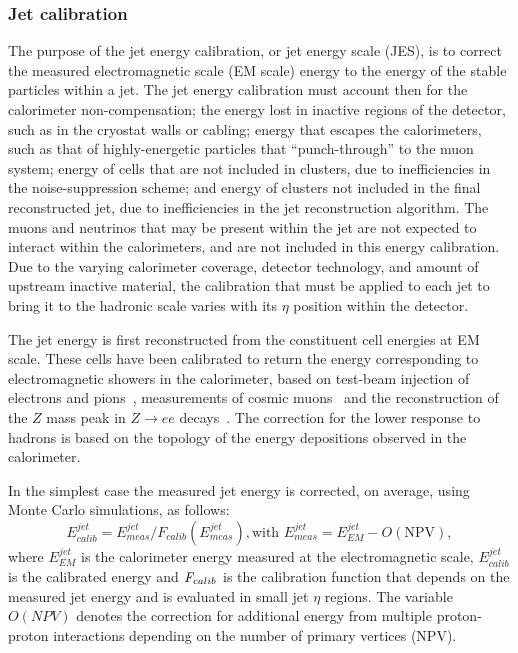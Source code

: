 \subsubsection{Jet calibration}

The purpose of the jet energy calibration, or jet energy scale (JES), is to correct the measured electromagnetic scale (EM scale) energy to the energy of the stable particles within a jet.  The jet energy calibration must account then for the calorimeter non-compensation; the energy lost in inactive regions of the detector, such as in the cryostat walls or cabling; energy that escapes the calorimeters, such as that of highly-energetic particles that ``punch-through'' to the muon system; energy of cells that are not included in clusters, due to inefficiencies in the noise-suppression scheme; and energy of clusters not included in the final reconstructed jet, due to inefficiencies in the jet reconstruction algorithm. The muons and neutrinos that may be present within the jet are not expected to interact within the calorimeters, and are not included in this energy calibration.
Due to the varying calorimeter coverage, detector technology, and amount of upstream inactive material, the calibration that must be applied to each jet to bring it to the hadronic scale varies with its $\eta$ position within the detector. 

The jet energy is first reconstructed from the constituent cell energies at EM scale. These cells have been calibrated to return the energy corresponding to electromagnetic showers in the calorimeter, based on test-beam injection of electrons and pions~\cite{Aharrouche2006601},  measurements of cosmic muons~\cite{Cooke:1071187} and the reconstruction of the $Z$ mass peak in $Z \rightarrow ee$ decays~\cite{Aad:2011mk}. The correction for the lower response to hadrons is based on the topology of the energy depositions observed in the calorimeter. 

In the simplest case the measured jet energy is corrected, on average, using Monte Carlo simulations, as follows:
%
\begin{equation}
E^{jet}_{calib} = E^{jet}_{meas} /F_{calib}(E^{jet}_{meas}),   \mbox{with  }   E^{jet}_{meas} = E^{jet}_{EM} - O(\mbox{NPV}),
\end{equation}
%
where $E^{jet}_{EM}$ is the calorimeter energy measured at the electromagnetic scale, $E^{jet}_{calib}$ is the calibrated energy and $\emph{F}_{calib}$ is the calibration function that depends on the measured jet energy and is evaluated in small jet $\eta$ regions. The variable $ O(NPV)$ denotes the correction for additional energy from multiple proton-proton interactions depending on the number of primary vertices (NPV).

